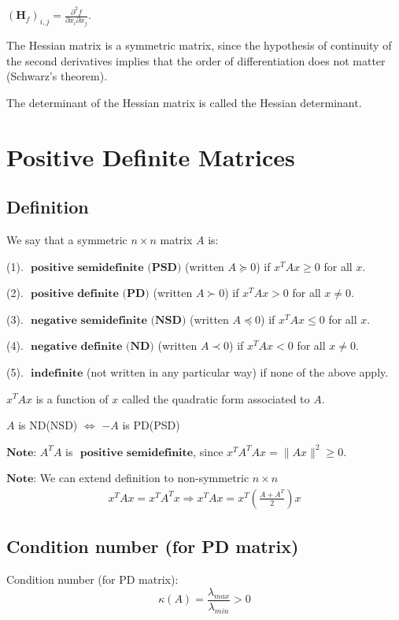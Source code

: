\documentclass[11pt]{elegantbook}
\begin{document}
$
\left(\mathbf{H}_{f}\right)_{i, j}=\frac{\partial^{2} f}{\partial x_{i} \partial x_{j}}.
$

The Hessian matrix is a symmetric matrix, since the hypothesis of continuity of the second derivatives implies that the order of differentiation does not matter (Schwarz's theorem).

The determinant of the Hessian matrix is called the Hessian determinant.

\section{Positive Definite Matrices}
\subsection{Definition}
We say that a symmetric $n \times n$ matrix $A$ is:

(1). $\textbf{ positive semidefinite (PSD)}$ (written $A \succeq 0$) if $x^TAx \geq 0$ for all $x$.

(2). $\textbf{ positive definite (PD)}$ (written $A \succ 0$) if $x^TAx > 0$ for all $x\neq 0$.

(3). $\textbf{ negative semidefinite (NSD)}$ (written $A \preceq 0$) if $x^TAx \leq 0$ for all $x$.

(4). $\textbf{ negative definite (ND)}$ (written $A \prec 0$) if $x^TAx < 0$ for all $x\neq 0$.

(5). $\textbf{ indefinite}$ (not written in any particular way) if none of the above apply.

$x^TAx$ is a function of $x$ called the quadratic form associated to $A$.

$A$ is ND(NSD) $\Leftrightarrow$ $-A$ is PD(PSD)

$\textbf{Note:}$ $A^TA$ is $\textbf{ positive semidefinite}$, since $x^TA^TAx=\|Ax\|^2\geq 0$.

$\textbf{Note:}$ We can extend definition to non-symmetric $n\times n$
\begin{equation}
    \begin{aligned}
        x^TAx=x^TA^Tx \Rightarrow x^TAx=x^T(\frac{A+A^T}{2})x
    \end{aligned}
    \nonumber
\end{equation}

\subsection{Condition number (for PD matrix)}
Condition number (for PD matrix):$$\kappa (A)=\frac{\lambda_{max}}{\lambda_{min}}>0$$
\end{document}
